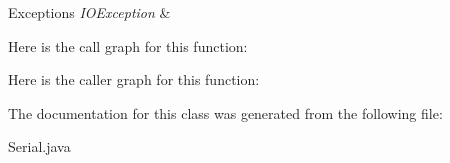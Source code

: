\begin{DoxyExceptions}{Exceptions}
{\em I\+O\+Exception} & \\
\hline
\end{DoxyExceptions}


Here is the call graph for this function\+:




Here is the caller graph for this function\+:




The documentation for this class was generated from the following file\+:\begin{DoxyCompactItemize}
\item 
Serial.\+java\end{DoxyCompactItemize}
